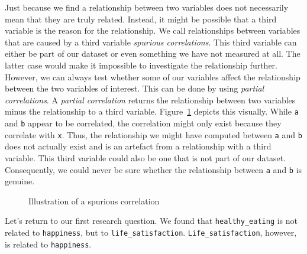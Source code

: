 \documentclass[
  letterpaper,
]{krantz}
\begin{document}
Just because we find a relationship between two variables does not
necessarily mean that they are truly related. Instead, it might be
possible that a third variable is the reason for the relationship. We
call relationships between variables that are caused by a third variable
\emph{spurious correlations}. This third variable can either be part of
our dataset or even something we have not measured at all. The latter
case would make it impossible to investigate the relationship further.
However, we can always test whether some of our variables affect the
relationship between the two variables of interest. This can be done by
using \emph{partial correlations}. A \emph{partial correlation} returns
the relationship between two variables minus the relationship to a third
variable. Figure~\ref{fig-illustration-spurious-correlation} depicts
this visually. While \texttt{a} and \texttt{b} appear to be correlated,
the correlation might only exist because they correlate with \texttt{x}.
Thus, the relationship we might have computed between \texttt{a} and
\texttt{b} does not actually exist and is an artefact from a
relationship with a third variable. This third variable could also be
one that is not part of our dataset. Consequently, we could never be
sure whether the relationship between \texttt{a} and \texttt{b} is
genuine.

\begin{figure}


\caption{\label{fig-illustration-spurious-correlation}Illustration of a
spurious correlation}

\end{figure}%

Let's return to our first research question. We found that
\texttt{healthy\_eating} is not related to \texttt{happiness}, but to
\texttt{life\_satisfaction}. \texttt{Life\_satisfaction}, however, is
related to \texttt{happiness}.
\end{document}
